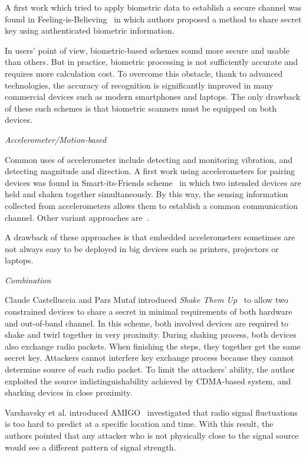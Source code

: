 A first work which tried to apply biometric data to establish a secure channel was found in Feeling-is-Believing~\cite{Buhan_feelingis} in which authors proposed a method to share secret key using authenticated biometric information. 

In users' point of view, biometric-based schemes sound more secure and usable than others. But in practice, biometric processing is not sufficiently accurate and requires more calculation cost. To overcome this obstacle, thank to advanced technologies, the accuracy of recognition is significantly improved in many commercial devices such as modern smartphones and laptops. The only drawback of these such schemes is that biometric scanners must be equipped on both devices. 

\emph{Accelerometer/Motion-based}

Common uses of accelerometer include detecting and monitoring vibration, and detecting magnitude and direction. A first work using accelerometers for pairing devices was found in Smart-its-Friends scheme~\cite{Holmquist:2001kl} in which two intended devices are held and shaken together simultaneously. By this way, the sensing information collected from accelerometers allows them to establish a common communication channel. Other variant approaches are~\cite{Lester04areyou,Mayrhofer:2007oq,Studer:2011:DBS:2076732.2076780,Groza:2012:SSA:,Chong:2010:GUD:1851600.1851644, Chagnaadorj:2013aa}.

A drawback of these approaches is that embedded accelerometers sometimes are not always easy to be deployed in big devices such as printers, projectors or laptops.

\emph{Combination}

Claude Castelluccia and Pars Mutaf introduced \emph{Shake Them Up}~\cite{Castelluccia:2005} to allow two constrained devices to share a secret in minimal requirements of both hardware and out-of-band channel. In this scheme, both involved devices are required to shake and twirl together in very proximity. During shaking process, both devices also exchange radio packets. When finishing the steps, they together get the same secret key. Attackers cannot interfere key exchange process because they cannot determine source of each radio packet. To limit the attackers' ability, the author exploited the source indistinguishability achieved by CDMA-based system, and sharking devices in close proximity. 

Varshavsky et al. introduced AMIGO~\cite{Scannell07amigo:proximity-based} investigated that radio signal fluctuations is too hard to predict at a specific location and time. With this result, the authors pointed that any attacker who is not physically close to the signal source would see a different pattern of signal strength. 

